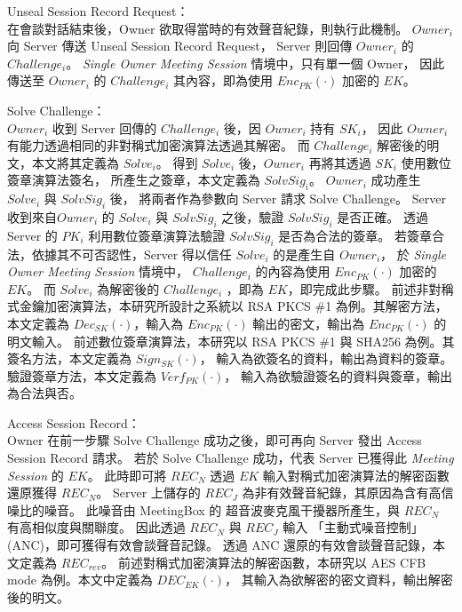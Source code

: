 \begin{steps}
    \item Unseal Session Record Request：\\
        在會談對話結束後，Owner 欲取得當時的有效聲音紀錄，則執行此機制。
        $Owner_{i}$ 向 Server 傳送 Unseal Session Record Request，
        Server 則回傳 $Owner_{i}$ 的 $Challenge_{i}$。
        {\it Single Owner Meeting Session} 情境中，只有單一個 Owner，
        因此傳送至 $Owner_{i}$ 的 $Challenge_{i}$ 其內容，即為使用 $Enc_{PK}(·)$ 加密的 $EK$。

    \item Solve Challenge：\\
        $Owner_{i}$ 收到 Server 回傳的 $Challenge_{i}$ 後，因 $Owner_{i}$ 持有 $SK_{i}$，
        因此 $Owner_{i}$ 有能力透過相同的非對稱式加密演算法透過其解密。
        而 $Challenge_{i}$ 解密後的明文，本文將其定義為 $Solve_{i}$。
        得到 $Solve_{i}$ 後，$Owner_{i}$ 再將其透過 $SK_{i}$ 使用數位簽章演算法簽名，
        所產生之簽章，本文定義為 $SolvSig_{i}$。
        $Owner_{i}$ 成功產生 $Solve_{i}$ 與 $SolvSig_{i}$ 後，
        將兩者作為參數向 Server 請求 Solve Challenge。
        Server 收到來自$Owner_{i}$ 的 $Solve_{i}$ 與 $SolvSig_{i}$ 之後，驗證 $SolvSig_{i}$ 是否正確。
        透過 Server 的 $PK_{i}$ 利用數位簽章演算法驗證 $SolvSig_{i}$ 是否為合法的簽章。
        若簽章合法，依據其不可否認性，Server 得以信任 $Solve_{i}$ 的是產生自 $Owner_{i}$，
        於 {\it Single Owner Meeting Session} 情境中，
        $Challenge_{i}$ 的內容為使用 $Enc_{PK}(·)$ 加密的 $EK$。
        而 $Solve_{i}$ 為解密後的 $Challenge_{i}$ ，即為 $EK$，即完成此步驟。
        前述非對稱式金鑰加密演算法，本研究所設計之系統以 RSA PKCS \#1 為例。其解密方法，
        本文定義為 $Dec_{SK}(·)$，輸入為 $Enc_{PK}(·)$ 輸出的密文，輸出為 $Enc_{PK}(·)$ 的明文輸入。
        前述數位簽章演算法，本研究以 RSA PKCS \#1 與 SHA256 為例。其簽名方法，本文定義為 $Sign_{SK}(·)$，
        輸入為欲簽名的資料，輸出為資料的簽章。驗證簽章方法，本文定義為 $Verf_{PK}(·)$，
        輸入為欲驗證簽名的資料與簽章，輸出為合法與否。

    \item Access Session Record：\\
        Owner 在前一步驟 Solve Challenge 成功之後，即可再向 Server 發出 Access Session Record 請求。
        若於 Solve Challenge 成功，代表 Server 已獲得此 {\it Meeting Session} 的 $EK$。
        此時即可將 $REC_{N}$ 透過 $EK$ 輸入對稱式加密演算法的解密函數還原獲得 $REC_{N}$。
        Server 上儲存的 $REC_{J}$ 為非有效聲音紀錄，其原因為含有高信噪比的噪音。
        此噪音由 MeetingBox 的 超音波麥克風干擾器所產生，與 $REC_{N}$ 有高相似度與關聯度。
        因此透過 $REC_{N}$ 與 $REC_{J}$ 輸入 「主動式噪音控制」(ANC)，即可獲得有效會談聲音記錄。
        透過 ANC 還原的有效會談聲音記錄，本文定義為 $REC_{rev}$。
        前述對稱式加密演算法的解密函數，本研究以 AES CFB mode 為例。本文中定義為 $DEC_{EK}(·)$，
        其輸入為欲解密的密文資料，輸出解密後的明文。
\end{steps}


